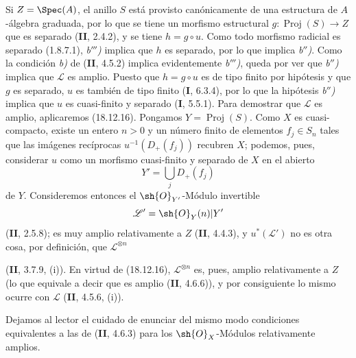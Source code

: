 Si $Z=\Spec(A)$, el anillo $S$ está provisto canónicamente de una estructura de $A$-álgebra graduada, por lo que se tiene un morfismo estructural $g:\operatorname{Proj}(S)\to Z$ que es separado (\textbf{II}, 2.4.2), y se tiene $h=g\circ u$. Como todo morfismo radicial es separado (1.8.7.1), \emph{b$'''$)} implica que $h$ es separado, por lo que implica \emph{b$''$)}. Como la condición \emph{b)} de (\textbf{II}, 4.5.2) implica evidentemente \emph{b$'''$)}, queda por ver que \emph{b$''$)} implica que $\mathscr L$ es amplio. Puesto que $h=g\circ u$ es de tipo finito por hipótesis y que $g$ es separado, $u$ es también de tipo finito (\textbf I, 6.3.4), por lo que la hipótesis \emph{b$''$)} implica que $u$ es cuasi-finito y separado (\textbf I, 5.5.1). Para demostrar que $\mathscr L$ es amplio, aplicaremos (18.12.16). Pongamos $Y=\operatorname{Proj}(S)$. Como $X$ es cuasi-compacto, existe un entero $n>0$ y un número finito de elementos $f_j\in S_n$ tales que las imágenes recíprocas $u^{-1}(D_+(f_j))$ recubren $X$; podemos, pues, considerar $u$ como un morfismo cuasi-finito y separado de $X$ en el abierto
\[
  Y'=\bigcup_j D_+(f_j)
\]
de $Y$. Consideremos entonces el $\sh{O}_{Y'}$-Módulo invertible
\[
  \mathscr L'=\sh{O}_Y(n)|Y'
\]
(\textbf{II}, 2.5.8); es muy amplio relativamente a $Z$ (\textbf{II}, 4.4.3), y $u^*(\mathscr L')$ no es otra cosa, por definición, que $\mathscr L^{\otimes n}$


(\textbf{II}, 3.7.9, (i)). En virtud de (18.12.16), $\mathscr L^{\otimes n}$ es, pues, amplio relativamente a $Z$ (lo que equivale a decir que es amplio (\textbf{II}, 4.6.6)), y por consiguiente lo mismo ocurre con $\mathscr L$ (\textbf{II}, 4.5.6, (i)).

Dejamos al lector el cuidado de enunciar del mismo modo condiciones equivalentes a las de (\textbf{II}, 4.6.3) para los $\sh{O}_X$-Módulos relativamente amplios.
